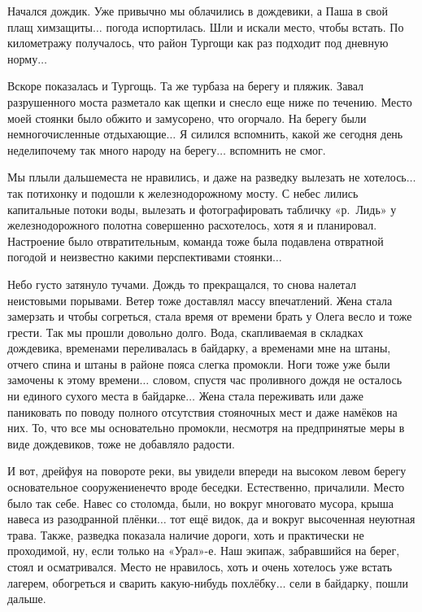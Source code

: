 Начался дождик. Уже привычно мы облачились в дождевики, а Паша в свой плащ химзащиты$\ldots$ погода испортилась. Шли и искали место, чтобы встать. По километражу получалось, что район Тургощи как раз подходит под дневную норму$\ldots$

Вскоре показалась и Тургощь. Та же турбаза на берегу и пляжик. Завал разрушенного моста разметало как щепки и снесло еще ниже по течению. Место моей стоянки было обжито и замусорено, что огорчало. На берегу были немногочисленные отдыхающие$\ldots$ Я силился вспомнить, какой же сегодня день недели\mdash почему так много народу на берегу$\ldots$ вспомнить не смог. 

Мы плыли дальше\mdash места не нравились, и даже на разведку вылезать не хотелось$\ldots$ так потихонку и подошли к железнодорожному мосту. С небес лились капитальные потоки воды, вылезать и фотографировать табличку «р.~Лидь» у железнодорожного полотна совершенно расхотелось, хотя я и планировал. Настроение было отвратительным, команда тоже была подавлена отвратной погодой и неизвестно какими перспективами стоянки$\ldots$

Небо густо затянуло тучами. Дождь то прекращался, то снова налетал неистовыми порывами. Ветер тоже доставлял массу впечатлений. Жена стала замерзать и чтобы согреться, стала время от времени брать у Олега весло и тоже грести. Так мы прошли довольно долго. Вода, скапливаемая в складках дождевика, временами переливалась в байдарку, а временами мне на штаны, отчего спина и штаны в районе пояса слегка промокли. Ноги тоже уже были замочены к этому времени$\ldots$ словом, спустя час проливного дождя не осталось ни единого сухого места в байдарке$\ldots$ Жена стала переживать или даже паниковать по поводу полного отсутствия стояночных мест и даже намёков на них. То, что все мы основательно промокли, несмотря на предпринятые меры в виде дождевиков, тоже не добавляло радости.

И вот, дрейфуя на повороте реки, вы увидели впереди на высоком левом берегу основательное сооружение\mdash нечто вроде беседки. Естественно, причалили. Место было так себе. Навес со столом\mdash да, были, но вокруг многовато мусора, крыша навеса из разодранной плёнки$\ldots$ тот ещё видок, да и вокруг высоченная неуютная трава. Также, разведка показала наличие дороги, хоть и практически не проходимой, ну, если только на «Урал»-е. Наш экипаж, забравшийся на берег, стоял и осматривался. Место не нравилось, хоть и очень хотелось уже встать лагерем, обогреться и сварить какую-нибудь похлёбку$\ldots$ сели в байдарку, пошли дальше.

